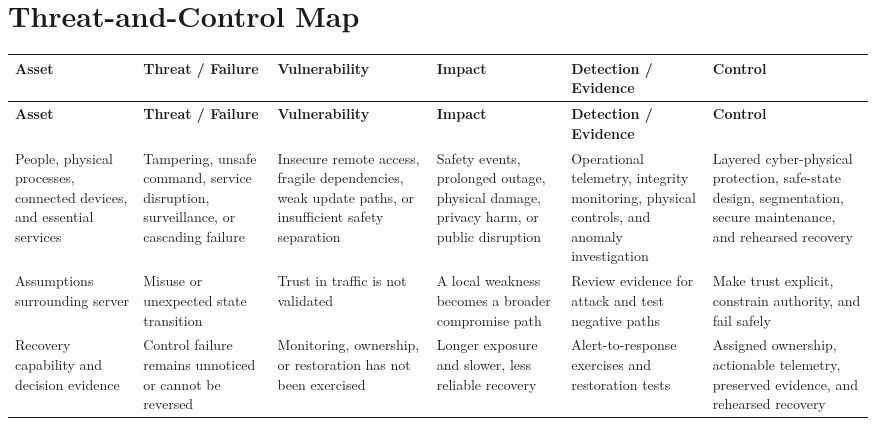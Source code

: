 \documentclass[11pt,letterpaper]{article}
\begin{document}
\section*{Threat-and-Control Map}
\begingroup\scriptsize\setlength{\tabcolsep}{2pt}
\begin{longtable}{>{\raggedright\arraybackslash}p{}>{\raggedright\arraybackslash}p{}>{\raggedright\arraybackslash}p{}>{\raggedright\arraybackslash}p{}>{\raggedright\arraybackslash}p{}>{\raggedright\arraybackslash}p{}}
\toprule\rowcolor{Navy}\color{white}\textbf{Asset} & \color{white}\textbf{Threat / Failure} & \color{white}\textbf{Vulnerability} & \color{white}\textbf{Impact} & \color{white}\textbf{Detection / Evidence} & \color{white}\textbf{Control}\\\midrule
\endfirsthead
\toprule\rowcolor{Navy}\color{white}\textbf{Asset} & \color{white}\textbf{Threat / Failure} & \color{white}\textbf{Vulnerability} & \color{white}\textbf{Impact} & \color{white}\textbf{Detection / Evidence} & \color{white}\textbf{Control}\\\midrule
\endhead
People, physical processes, connected devices, and essential services & Tampering, unsafe command, service disruption, surveillance, or cascading failure & Insecure remote access, fragile dependencies, weak update paths, or insufficient safety separation & Safety events, prolonged outage, physical damage, privacy harm, or public disruption & Operational telemetry, integrity monitoring, physical controls, and anomaly investigation & Layered cyber-physical protection, safe-state design, segmentation, secure maintenance, and rehearsed recovery\\\midrule
Assumptions surrounding server & Misuse or unexpected state transition & Trust in traffic is not validated & A local weakness becomes a broader compromise path & Review evidence for attack and test negative paths & Make trust explicit, constrain authority, and fail safely\\\midrule
Recovery capability and decision evidence & Control failure remains unnoticed or cannot be reversed & Monitoring, ownership, or restoration has not been exercised & Longer exposure and slower, less reliable recovery & Alert-to-response exercises and restoration tests & Assigned ownership, actionable telemetry, preserved evidence, and rehearsed recovery\\\midrule
\bottomrule
\end{longtable}
\endgroup
\end{document}
